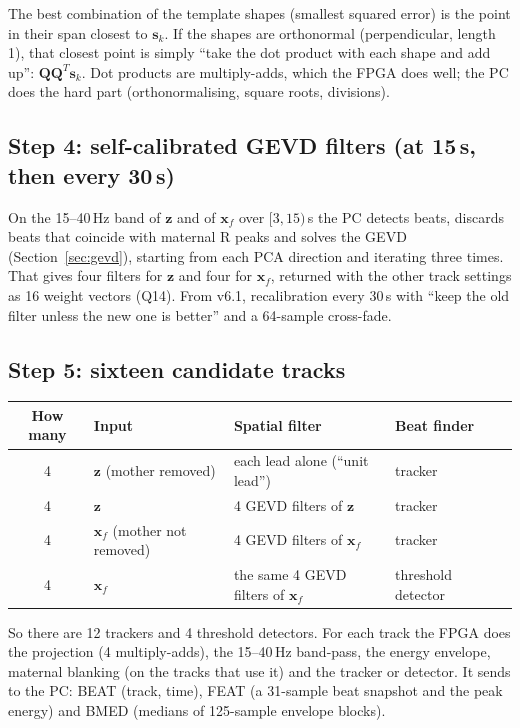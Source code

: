 \documentclass[11pt]{article}
\begin{document}
\begin{simple}
The best combination of the template shapes (smallest squared error) is the point in their span closest to $\mathbf{s}_k$. If the shapes are orthonormal (perpendicular, length 1), that closest point is simply ``take the dot product with each shape and add up'': $\mathbf{Q}\mathbf{Q}^T\mathbf{s}_k$. Dot products are multiply-adds, which the FPGA does well; the PC does the hard part (orthonormalising, square roots, divisions).
\end{simple}

\subsection{Step 4: self-calibrated GEVD filters (at 15\,s, then every 30\,s)}
On the 15--40\,Hz band of $\mathbf{z}$ and of $\mathbf{x}_f$ over $[3, 15)$\,s the PC detects beats, discards beats that coincide with maternal R peaks and solves the GEVD (Section~\ref{sec:gevd}), starting from each PCA direction and iterating three times. That gives four filters for $\mathbf{z}$ and four for $\mathbf{x}_f$, returned with the other track settings as 16 weight vectors (Q14). From v6.1, recalibration every 30\,s with ``keep the old filter unless the new one is better'' and a 64-sample cross-fade.

\subsection{Step 5: sixteen candidate tracks}
\begin{center}
\small
\begin{tabular}{@{}cllll@{}}
\toprule
\textbf{How many} & \textbf{Input} & \textbf{Spatial filter} & \textbf{Beat finder} \\
\midrule
4 & $\mathbf{z}$ (mother removed) & each lead alone (``unit lead'') & tracker \\
4 & $\mathbf{z}$ & 4 GEVD filters of $\mathbf{z}$ & tracker \\
4 & $\mathbf{x}_f$ (mother not removed) & 4 GEVD filters of $\mathbf{x}_f$ & tracker \\
4 & $\mathbf{x}_f$ & the same 4 GEVD filters of $\mathbf{x}_f$ & threshold detector \\
\bottomrule
\end{tabular}
\end{center}
So there are 12 trackers and 4 threshold detectors. For each track the FPGA does the projection (4 multiply-adds), the 15--40\,Hz band-pass, the energy envelope, maternal blanking (on the tracks that use it) and the tracker or detector. It sends to the PC: BEAT (track, time), FEAT (a 31-sample beat snapshot and the peak energy) and BMED (medians of 125-sample envelope blocks).
\end{document}
